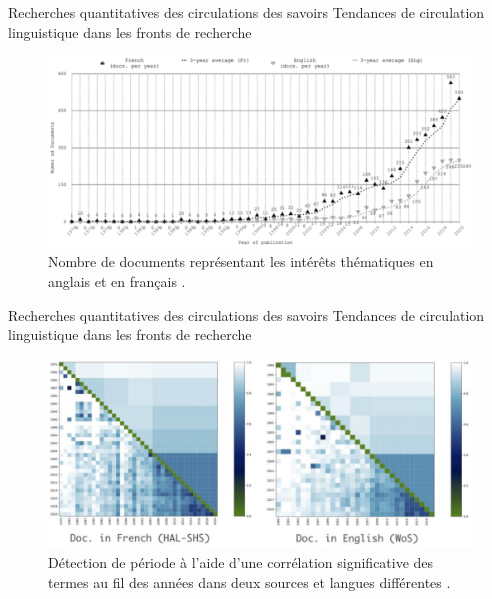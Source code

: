 \begin{frame}{Recherches quantitatives des circulations des savoirs}
	Tendances de circulation linguistique dans les fronts de recherche 

	
			        \begin{figure}[!h]
		\centering
		\includegraphics[width=1\textwidth]{pic/thematic_interests.png}
		\caption{Nombre de documents représentant les intérêts thématiques en anglais et en français \citep{milia2023}.}
	\end{figure}
	
\end{frame}


\begin{frame}{Recherches quantitatives des circulations des savoirs}
	Tendances de circulation linguistique dans les fronts de recherche 
	
	
	\begin{figure}[!h]
		\centering
		\includegraphics[width=1\textwidth]{pic/period_detection.png}
		\caption{Détection de période à l'aide d'une corrélation significative des termes au fil des années dans deux sources et langues différentes \citep{milia2023}.}
	\end{figure}
	
\end{frame}



